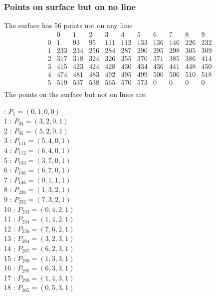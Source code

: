 \documentclass{article}
\begin{document}
{\subsubsection*{Points on surface but on no line}
The surface has 56 points not on any line:\\
$$
\begin{array}{r|*{10}{r}}
 & 0 & 1 & 2 & 3 & 4 & 5 & 6 & 7 & 8 & 9\\
\hline
0 & 1 & 93 & 95 & 111 & 112 & 133 & 136 & 146 & 226 & 232\\
1 & 233 & 234 & 256 & 284 & 287 & 290 & 295 & 298 & 305 & 309\\
2 & 317 & 318 & 324 & 326 & 355 & 370 & 371 & 385 & 386 & 414\\
3 & 415 & 423 & 424 & 428 & 430 & 434 & 436 & 441 & 448 & 450\\
4 & 474 & 481 & 483 & 492 & 495 & 499 & 500 & 506 & 510 & 518\\
5 & 519 & 537 & 538 & 565 & 570 & 573 & 0 & 0 & 0 & 0\\
\end{array}
$$
The points on the surface but not on lines are:\\
\begin{multicols}{2}
 : $P_{1}=( 0, 1, 0, 0 )$\\
1 : $P_{93}=( 3, 2, 0, 1 )$\\
2 : $P_{95}=( 5, 2, 0, 1 )$\\
3 : $P_{111}=( 5, 4, 0, 1 )$\\
4 : $P_{112}=( 6, 4, 0, 1 )$\\
5 : $P_{133}=( 3, 7, 0, 1 )$\\
6 : $P_{136}=( 6, 7, 0, 1 )$\\
7 : $P_{146}=( 0, 1, 1, 1 )$\\
8 : $P_{226}=( 1, 3, 2, 1 )$\\
9 : $P_{232}=( 7, 3, 2, 1 )$\\
10 : $P_{233}=( 0, 4, 2, 1 )$\\
11 : $P_{234}=( 1, 4, 2, 1 )$\\
12 : $P_{256}=( 7, 6, 2, 1 )$\\
13 : $P_{284}=( 3, 2, 3, 1 )$\\
14 : $P_{287}=( 6, 2, 3, 1 )$\\
15 : $P_{290}=( 1, 3, 3, 1 )$\\
16 : $P_{295}=( 6, 3, 3, 1 )$\\
17 : $P_{298}=( 1, 4, 3, 1 )$\\
18 : $P_{305}=( 0, 5, 3, 1 )$\\

\end{multicols}}
\end{document}
